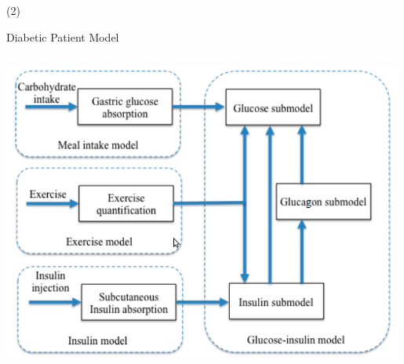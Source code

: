 \begin{frame}{ (2)}
\begin{block}{Diabetic Patient Model}
\begin{columns}
\begin{column}{0.5\textwidth}
\begin{center}
     \includegraphics[width=0.99\textwidth]{Figs/Diabetes1}
     \end{center}
     \end{column}
     \end{columns}
\end{block}
\end{frame}


